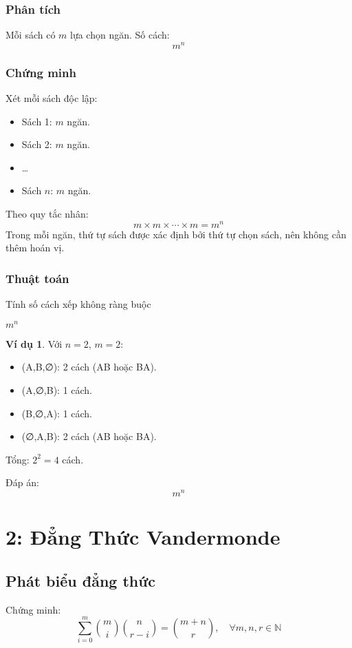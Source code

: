 \documentclass[a4paper,12pt]{article}
\theoremstyle{plain}
\theoremstyle{definition}
\newtheorem{example}{Ví dụ}
\begin{document}
\subsubsection*{Phân tích}
Mỗi sách có \( m \) lựa chọn ngăn. Số cách:
\[
m^n
\]

\subsubsection*{Chứng minh}
Xét mỗi sách độc lập:
\begin{itemize}
    \item Sách 1: \( m \) ngăn.
    \item Sách 2: \( m \) ngăn.
    \item \ldots
    \item Sách \( n \): \( m \) ngăn.
\end{itemize}
Theo quy tắc nhân:
\[
m \times m \times \cdots \times m = m^n
\]
Trong mỗi ngăn, thứ tự sách được xác định bởi thứ tự chọn sách, nên không cần thêm hoán vị.

\subsubsection*{Thuật toán}
\begin{algorithm}
\caption{Tính số cách xếp không ràng buộc}
\begin{algorithmic}
    \State \Return $m^n$
\EndFunction
\end{algorithmic}
\end{algorithm}

\begin{example}
Với \( n=2 \), \( m=2 \):
\begin{itemize}
    \item (A,B,∅): 2 cách (AB hoặc BA).
    \item (A,∅,B): 1 cách.
    \item (B,∅,A): 1 cách.
    \item (∅,A,B): 2 cách (AB hoặc BA).
\end{itemize}
Tổng: \( 2^2 = 4 \) cách.
\end{example}

Đáp án:
\[
\boxed{m^n}
\]

\section*{2: Đẳng Thức Vandermonde}

\subsection*{Phát biểu đẳng thức}
Chứng minh:
\[
\sum_{i=0}^m \binom{m}{i}\binom{n}{r-i} = \binom{m+n}{r}, \quad \forall m,n,r \in \mathbb{N}
\]
\end{document}
